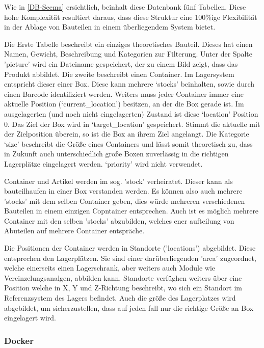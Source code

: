 Wie in \ref{DB-Scema} ersichtlich, beinhalt diese Datenbank fünf Tabellen. Diese hohe Komplexität resultiert daraus, dass diese Struktur eine 100\%ige Flexibilität in der Ablage von Bauteilen in einem überliegendem System bietet.

Die Erste Tabelle beschreibt ein einziges theoretisches Bauteil. Dieses hat einen Namen, Gewicht, Beschreibung und Kategorien zur Filterung. Unter der Spalte 'picture' wird ein Dateiname gespeichert, der zu einem Bild zeigt, dass das Produkt abbildet.
Die zweite beschreibt einen Container. Im Lagersystem entspricht dieser einer Box. Diese kann mehrere `stocks' beinhalten, sowie durch einen Barcode identifiziert werden. Weiters muss jeder Container immer eine aktuelle Position (`current\_location') besitzen, an der die Box gerade ist. Im ausgelagerten (und noch nicht eingelagerten) Zustand ist diese `location' Position 0. Das Ziel der Box wird in `target\_location' gespeichert. Stimmt die aktuelle mit der Zielposition überein, so ist die Box an ihrem Ziel angelangt. Die Kategorie `size' beschreibt die Größe eines Containers und lässt somit theoretisch zu, dass in Zukunft auch unterschiedlich große Boxen zuverlässig in die richtigen Lagerplätze eingelagert werden. `priority' wird nicht verwendet.

Container und Artikel werden im sog. 'stock' verheiratet. Dieser kann als bauteilhaufen in einer Box verstanden werden. Es können also auch mehrere 'stocks' mit dem selben Container geben, dies würde mehreren verschiedenen Bauteilen in einem einzigen Copntainer entsprechen. Auch ist es möglich mehrere Container mit den selben 'stocks' abzubilden, welches ener aufteilung von Abuteilen auf mehrere Container entspräche.

Die Positionen der Container werden in Standorte ('locations') abgebildet. Diese entsprechen den Lagerplätzen. Sie sind einer darüberliegenden 'area' zugeordnet, welche einerseits einen Lagerschrank, aber weiters auch Module wie Vereinzelungsanalgen, abbilden kann. Standorte verfüghen weiters über eine Position welche in X, Y und Z-Richtung beschreibt, wo sich ein Standort im Referenzsystem des Lagers befindet. Auch die größe des Lagerplatzes wird abgebildet, um sicherzustellen, dass auf jeden fall nur die richtige Größe an Box eingelagert wird.


\subsubsection{Docker}

